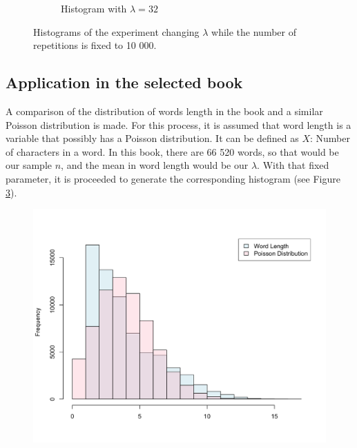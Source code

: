 \documentclass[10pt,leter,openany]{article}
\begin{document}
\begin{figure}
\begin{subfigure}[b]{0.475\textwidth}
	 		\caption[]%
	 		{{\small Histogram with $\lambda = 32$}}    
	 		\label{fig:mean and std of net44}
	 	\end{subfigure}
	 	\caption[ The average and standard deviation of critical parameters ]
	 	{\small Histograms of the experiment changing $\lambda$ while the number of repetitions is fixed to 10 000.} 
	 	\label{fig:hg_changing_lambda}
	 \end{figure}
 
 	\clearpage
 	\subsection{Application in the selected book}
 
	A comparison of the distribution of words length in the book and a similar Poisson distribution is made. For this process, it is assumed that word length is a variable that possibly has a Poisson distribution. It can be defined as $ X $: Number of characters in a word. In this book, there are 66 520 words, so that would be our sample $ n $, and the mean in word length would be our $\lambda$. With that fixed parameter, it is proceeded to generate the corresponding histogram  (see Figure \ref{fig:hgP_WL}).
	
		\begin{figure}
			\begin{center}
				\includegraphics[scale=0.18]{extras/hg_Poisson_Words}
				\label{fig:hgP_WL}
			\end{center}
		\end{figure}
	
\end{document}
